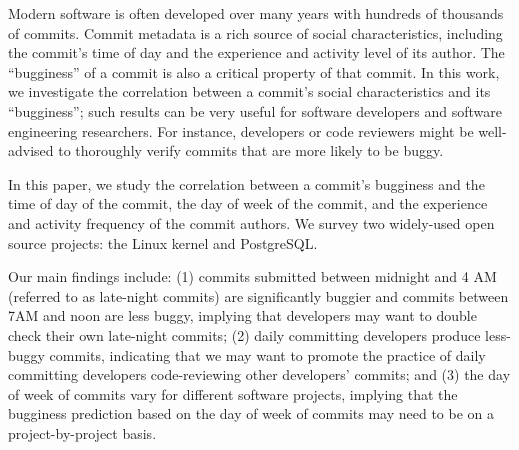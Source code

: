
Modern software is often developed over many years with hundreds of
thousands of commits. Commit metadata is a rich source of social
characteristics, including the commit's time of day and the
experience and activity level of its author.  The ``bugginess'' of a
commit is also a critical property of that commit.  In this work, we
investigate the correlation between a commit's social characteristics
and its ``bugginess''; such results can be very useful for software
developers and software engineering researchers. For instance,
developers or code reviewers might be well-advised to thoroughly
verify commits that are more likely to be buggy.

In this paper, we study the correlation between a commit's bugginess
and the time of day of the commit, the day of week of the commit, and
the experience and activity frequency of the commit authors.  We
survey two widely-used open source projects: the Linux kernel and
PostgreSQL.  

Our main findings include: (1) commits submitted between midnight and
4 AM (referred to as late-night commits) are significantly buggier 
and commits between 7AM and noon are less buggy, implying that developers 
may want to double check their own late-night commits; 
(2) daily committing developers produce less-buggy commits, indicating that we may 
want to promote the practice of daily committing developers code-reviewing other 
developers' commits; and (3) 
the day of week of commits
vary for different software projects, implying that the bugginess prediction based on 
the day of week of commits may need to be on a project-by-project basis.
